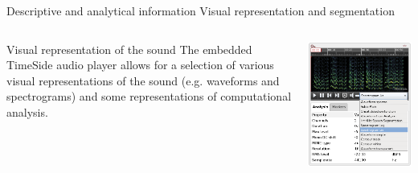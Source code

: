 \documentclass[final, hyperref, table]{beamer}
\begin{document}
  
\begin{frame}{Descriptive and analytical information}
{Visual representation and segmentation}
\scriptsize
\begin{columns}[T]
    \begin{column}{0.6\textwidth}
      \begin{block}{Visual representation of the sound}
       The embedded TimeSide audio player allows for a selection
        of various visual representations of the sound (e.g. \alert{waveforms
        and spectrograms}) and some representations of computational
        \alert{analysis}.
      \end{block}
    \end{column}
    \begin{column}{0.3\textwidth}
      \includegraphics[width=\linewidth]{../img/sound_representation.png}
    \end{column}
  \end{columns}
\vspace{-1.5cm}
  \begin{columns}[T]

\end{columns}
\end{frame}
\end{document}
